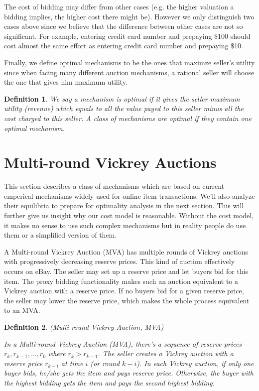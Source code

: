 \documentclass{aamas2012}
\newtheorem{definition}{Definition}
\begin{document}
The cost of bidding may differ from other cases (e.g. the higher valuation a
bidding implies, the higher cost there might be). However we only distinguish
two cases above since we believe that the difference between other cases are
not so significant. For example, entering credit card number and prepaying
\$100 should cost almost the same effort as entering credit card number and
prepaying \$10.

Finally, we define optimal mechanisms to be the ones that maximze seller's
utility since when facing many different auction mechanisms, a rational seller
will choose the one that gives him maximum utility.

\begin{definition}

We say a mechanism is optimal if it gives the seller maximum utility (revenue)
which equals to all the value payed to this seller minus all the cost charged
to this seller. A class of mechanisms are optimal if they contain one optimal
mechanism.

\end{definition}

\section{Multi-round Vickrey Auctions}

This section describes a class of mechanisms which are based on current
emperical mechanisms widely used for online item transactions. We'll also
analyze their equilibria to prepare for optimality analysis in the next
section.  This will further give us insight why our cost model is reasonable.
Without the cost model, it makes no sense to use such complex mechanisms but in
reality people do use them or a simplified version of them.

A Multi-round Vickrey Auction (MVA) has multiple rounds of Vickrey
auctions with progressively decreasing reserve prices. This kind of auction
effectively occurs on eBay. The seller may set up a reserve price and let
buyers bid for this item. The proxy bidding functionality makes such an auction
equivalent to a Vickrey auction with a reserve price. If no buyers bid for a
given reserve price, the seller may lower the reserve price, which makes the
whole process equivalent to an MVA.

\begin{definition}(Multi-round Vickrey Auction, MVA)

In a Multi-round Vickrey Auction (MVA), there's a sequence of reserve prices
$r_k, r_{k-1}, \ldots, r_0$ where $r_k > r_{k-1}$. The seller creates a Vickrey
auction with a reserve price $r_{k-i}$ at time $i$ (or round $k-i$). In each
Vickrey auction, if only one buyer bids, he/she gets the item and pays reserve
price. Otherwise, the buyer with the highest bidding gets the item and pays the
second highest bidding.

\end{definition}
\end{document}

